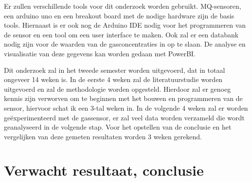 Er zullen verschillende tools voor dit onderzoek worden gebruikt. MQ-sensoren, een arduino uno en een breakout board met de nodige hardware zijn de basis tools. Hiernaast is er ook nog de Arduino IDE nodig voor het programmeren van de sensor en een tool om een user interface te maken. Ook zal er een databank nodig zijn voor de waarden van de gasconcentraties in op te slaan. De analyse en visualisatie van deze gegevens kan worden gedaan met PowerBI.

Dit onderzoek zal in het tweede semester worden uitgevoerd, dat in totaal ongeveer 14 weken is. In de eerste 4 weken zal de literatuurstudie worden uitgevoerd en zal de methodologie worden opgesteld. Hierdoor zal er genoeg kennis zijn verworven om te beginnen met het bouwen en programmeren van de sensor, hiervoor schat ik een 3-tal weken in. In de volgende 4 weken zal er worden geëxperimenteerd met de gassensor, er zal veel data worden verzameld die wordt geanalyseerd in de volgende stap. Voor het opstellen van de conclusie en het vergelijken van deze gemeten resultaten worden 3 weken gerekend.




\section{Verwacht resultaat, conclusie}%
\label{sec:verwachte_resultaten}
\begin{comment}
Hier beschrijf je welke resultaten je verwacht. Als je metingen en simulaties uitvoert, kan je hier al mock-ups maken van de grafieken samen met de verwachte conclusies. Benoem zeker al je assen en de onderdelen van de grafiek die je gaat gebruiken. Dit zorgt ervoor dat je concreet weet welk soort data je moet verzamelen en hoe je die moet meten.

Wat heeft de doelgroep van je onderzoek aan het resultaat? Op welke manier zorgt jouw bachelorproef voor een meerwaarde?

Hier beschrijf je wat je verwacht uit je onderzoek, met de motivatie waarom. Het is \textbf{niet} erg indien uit je onderzoek andere resultaten en conclusies vloeien dan dat je hier beschrijft: het is dan juist interessant om te onderzoeken waarom jouw hypothesen niet overeenkomen met de resultaten.


\end{comment}





